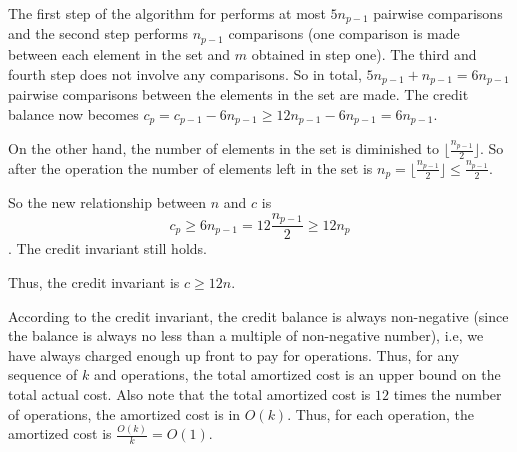 \documentclass[11pt, answers]{exam}
\theoremstyle{plain}
\theoremstyle{definition}
\begin{document}
\begin{questions}
\begin{solution}
The first step of the algorithm for  performs at most $5n_{p-1}$ pairwise comparisons and the second step performs $n_{p-1}$ comparisons (one comparison is made between each element in the set and $m$ obtained in step one). The third and fourth step does not involve any comparisons. So in total, $5n_{p-1}+n_{p-1}=6n_{p-1}$ pairwise comparisons between the elements in the set are made. The credit balance now becomes $c_p=c_{p-1}-6n_{p-1} \ge 12n_{p-1} - 6n_{p-1} = 6n_{p-1}$. 

On the other hand, the number of elements in the set is diminished to $\lfloor \frac{n_{p-1}}{2} \rfloor$. So after the operation the number of elements left in the set is $n_p = \lfloor \frac{n_{p-1}}{2} \rfloor \le \frac{n_{p-1}}{2}$.

So the new relationship between $n$ and $c$ is $$c_p \ge 6n_{p-1} = 12\frac{n_{p-1}}{2} \ge 12 n_p$$. The credit invariant still holds.

Thus, the credit invariant is $c \ge 12n$.

According to the credit invariant, the credit balance is always non-negative (since the balance is always no less than a multiple of non-negative number), i.e, we have always charged enough up front to pay for  operations. Thus, for any sequence of $k$  and  operations, the total amortized cost is an upper bound on the total actual cost. Also note that the total amortized cost is $12$ times the number of  operations, the amortized cost is in $O(k)$. Thus, for each operation, the amortized cost is $\frac{O(k)}{k} = O(1)$.


\end{solution}

\end{questions}
\end{document}
